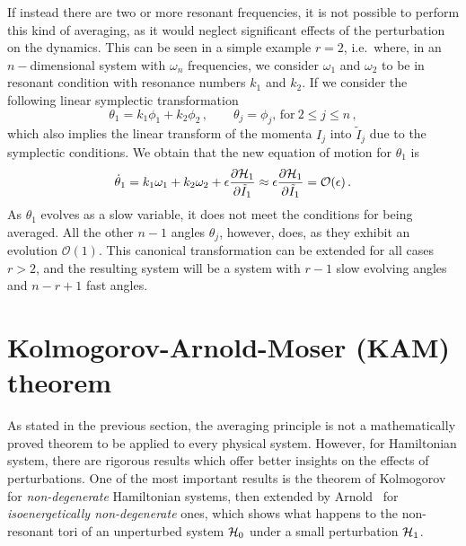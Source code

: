 If instead there are two or more resonant frequencies, it is not possible to perform this kind of averaging, as it would neglect significant effects of the perturbation on the dynamics. This can be seen in a simple example $r=2$, i.e.\ where, in an $n-$dimensional system with $\omega_n$ frequencies, we consider $\omega_1$ and $\omega_2$ to be in resonant condition with resonance numbers $k_1$ and $k_2$. If we consider the following linear symplectic transformation
\begin{equation}
    \theta_1 = k_1 \phi_1 + k_2 \phi_2\,,\qquad \theta_j=\phi_j,\, \text{for}\ 2\leq j \leq n\,,
\end{equation}
which also implies the linear transform of the momenta $I_j$ into $\tilde I_j$ due to the symplectic conditions. We obtain that the new equation of motion for $\theta_1$ is
\begin{equation}
    \dot\theta_1 = k_1\omega_1 + k_2\omega_2 + \epsilon \pdv{\mathcal{H}_1}{\tilde I_1} \approx \epsilon \pdv{\mathcal{H}_1}{\tilde I_1} = \mathcal{O}(\epsilon)\,.
\end{equation}
As $\theta_1$ evolves as a slow variable, it does not meet the conditions for being averaged. All the other $n - 1$ angles $\theta_j$, however, does, as they exhibit an evolution $\mathcal{O}(1)$. This canonical transformation can be extended for all cases $r>2$, and the resulting system will be a system with $r - 1$ slow evolving angles and $n - r + 1$ fast angles.  



\section{Kolmogorov-Arnold-Moser (KAM) theorem}\label{sec:1:kam}

As stated in the previous section, the averaging principle is not a mathematically proved theorem to be applied to every physical system. However, for Hamiltonian system, there are rigorous results which offer better insights on the effects of perturbations. One of the most important results is the theorem of Kolmogorov~\cite{} for \textit{non-degenerate} Hamiltonian systems, then extended by Arnold~\cite{} for \textit{isoenergetically non-degenerate} ones, which shows what happens to the non-resonant tori of an unperturbed system $\mathcal{H}_0$ under a small perturbation $\mathcal{H}_1$.


